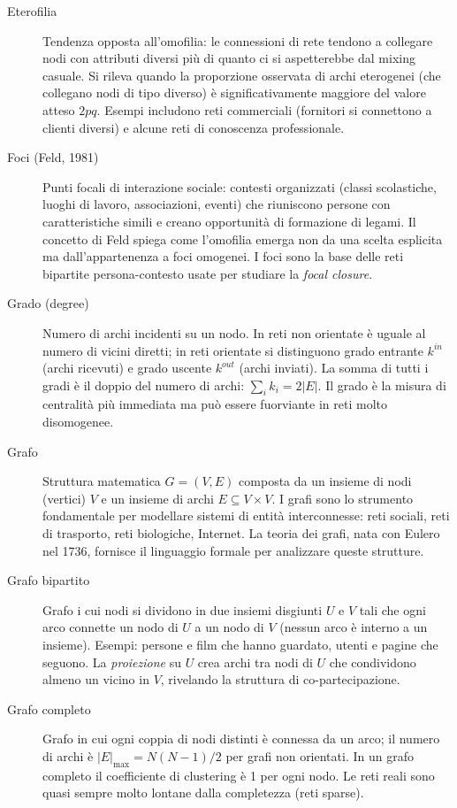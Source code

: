 \documentclass[12pt,a4paper]{article}
\begin{document}
\begin{description}
  \item[Eterofilia] Tendenza opposta all'omofilia: le connessioni di rete tendono a
  collegare nodi con attributi diversi più di quanto ci si aspetterebbe dal mixing
  casuale. Si rileva quando la proporzione osservata di archi eterogenei (che collegano
  nodi di tipo diverso) è significativamente maggiore del valore atteso $2pq$. Esempi
  includono reti commerciali (fornitori si connettono a clienti diversi) e alcune reti
  di conoscenza professionale.

  \item[Foci (Feld, 1981)] Punti focali di interazione sociale: contesti organizzati
  (classi scolastiche, luoghi di lavoro, associazioni, eventi) che riuniscono persone
  con caratteristiche simili e creano opportunità di formazione di legami. Il concetto di
  Feld spiega come l'omofilia emerga non da una scelta esplicita ma dall'appartenenza a
  foci omogenei. I foci sono la base delle reti bipartite persona-contesto usate per
  studiare la \textit{focal closure}.

  \item[Grado (degree)] Numero di archi incidenti su un nodo. In reti non orientate è
  uguale al numero di vicini diretti; in reti orientate si distinguono grado entrante
  $k^{in}$ (archi ricevuti) e grado uscente $k^{out}$ (archi inviati). La somma di
  tutti i gradi è il doppio del numero di archi: $\sum_i k_i = 2|E|$. Il grado è la
  misura di centralità più immediata ma può essere fuorviante in reti molto disomogenee.

  \item[Grafo] Struttura matematica $G=(V,E)$ composta da un insieme di nodi (vertici)
  $V$ e un insieme di archi $E \subseteq V \times V$. I grafi sono lo strumento
  fondamentale per modellare sistemi di entità interconnesse: reti sociali, reti di
  trasporto, reti biologiche, Internet. La teoria dei grafi, nata con Eulero nel 1736,
  fornisce il linguaggio formale per analizzare queste strutture.

  \item[Grafo bipartito] Grafo i cui nodi si dividono in due insiemi disgiunti $U$ e $V$
  tali che ogni arco connette un nodo di $U$ a un nodo di $V$ (nessun arco è interno a
  un insieme). Esempi: persone e film che hanno guardato, utenti e pagine che seguono.
  La \textit{proiezione} su $U$ crea archi tra nodi di $U$ che condividono almeno un
  vicino in $V$, rivelando la struttura di co-partecipazione.

  \item[Grafo completo] Grafo in cui ogni coppia di nodi distinti è connessa da un arco;
  il numero di archi è $|E|_{\max} = N(N-1)/2$ per grafi non orientati. In un grafo
  completo il coefficiente di clustering è 1 per ogni nodo. Le reti reali sono quasi
  sempre molto lontane dalla completezza (reti sparse).


\end{description}
\end{document}
